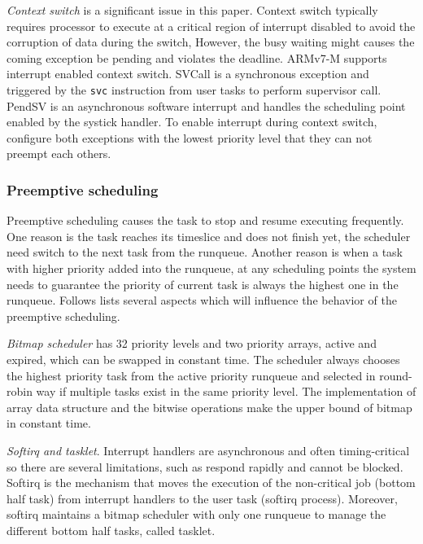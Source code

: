 \textit{Context switch} is a significant issue in this paper. Context switch typically requires processor to execute at a critical region of interrupt disabled to avoid the corruption of data during the switch, However, the busy waiting might causes the coming exception be pending and violates the deadline. ARMv7-M supports interrupt enabled context switch. SVCall is a synchronous exception and triggered by the \texttt{svc} instruction from user tasks to perform supervisor call. PendSV is an asynchronous software interrupt and handles the scheduling point enabled by the systick handler. To enable interrupt during context switch, configure both exceptions with the lowest priority level that they can not preempt each others.

\subsubsection{Preemptive scheduling}
Preemptive scheduling causes the task to stop and resume executing frequently. One reason is the task reaches its timeslice and does not finish yet, the scheduler need switch to the next task from the runqueue. Another reason is when a task with higher priority added into the runqueue, at any scheduling points the system needs to guarantee the priority of current task is always the highest one in the runqueue. Follows lists several aspects which will influence the behavior of the preemptive scheduling.

\textit{Bitmap scheduler} has 32 priority levels and two priority arrays, active and expired, which can be swapped in constant time. The scheduler always chooses the highest priority task from the active priority runqueue and selected in round-robin way if multiple tasks exist in the same priority level. The implementation of array data structure and the bitwise operations make the upper bound of bitmap in constant time.

\textit{Softirq and tasklet}. Interrupt handlers are asynchronous and often timing-critical so there are several limitations, such as respond rapidly and cannot be blocked. Softirq is the mechanism that moves the execution of the non-critical job (bottom half task) from interrupt handlers to the user task (softirq process). Moreover, softirq maintains a bitmap scheduler with only one runqueue to manage the different bottom half tasks, called tasklet.

